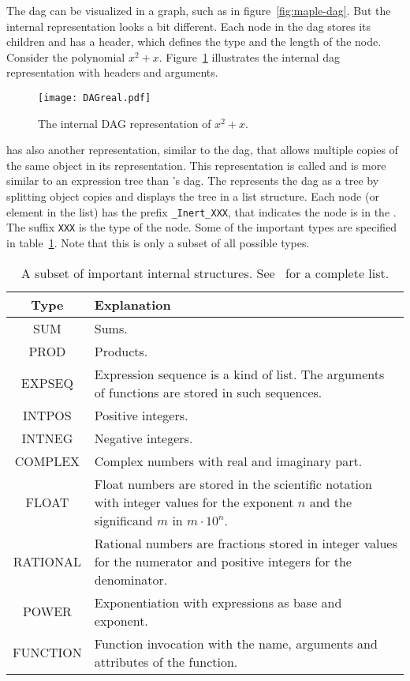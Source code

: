 The \Maple{} \gls{dag} can be visualized in a graph, such as in figure~\ref{fig:maple-dag}. But the internal representation looks a bit different. Each node in the \gls{dag} stores its children and has a header, which defines the type and the length of the node. Consider the polynomial $x^2+x$. Figure~\ref{fig:internal-maple-dag} illustrates the internal \gls{dag} representation with headers and arguments.

\begin{figure}[ht]
	\centering
	\texttt{[image: DAGreal.pdf]}
	\caption{The internal \Maple{} DAG representation of $x^2+x$.}
	\label{fig:internal-maple-dag}
\end{figure}

\Maple{} has also another representation, similar to the \gls{dag}, that allows multiple copies of the same object in its representation. This representation is called \inertF{} and is more similar to an expression tree than \Maple's \gls{dag}. The \inertF{} represents the \gls{dag} as a tree by splitting object copies and displays the tree in a list structure. Each node (or element in the list) has the prefix \texttt{\_Inert\_XXX}, that indicates the node is in the \inertF. The suffix \texttt{XXX} is the type of the node. Some of the important types are specified in table~\ref{tab:maple-types}. Note that this is only a subset of all possible types.

\begin{table}[ht]
\centering
\begin{tabular}{cp{10cm}}
	\hline
	Type & Explanation\\
	\hline
	SUM & Sums.\\
	PROD & Products.\\
	EXPSEQ & Expression sequence is a kind of list. The arguments of functions are stored in such sequences.\\
	INTPOS & Positive integers.\\
	INTNEG & Negative integers.\\
	COMPLEX & Complex numbers with real and imaginary part.\\
	FLOAT & Float numbers are stored in the scientific notation with integer values for the exponent $n$ and the significand $m$ in $m \cdot 10^n$.\\
	RATIONAL & Rational numbers are fractions stored in integer values for the numerator and positive integers for the denominator.\\
	POWER & Exponentiation with expressions as base and exponent.\\
	FUNCTION & Function invocation with the name, arguments and attributes of the function.\\
	\hline
\end{tabular}
\caption{A subset of important internal \Maple{} structures. See~\parencite{MAPLE:ProgrammingGuide} for a complete list.}
\label{tab:maple-types}
\end{table}

